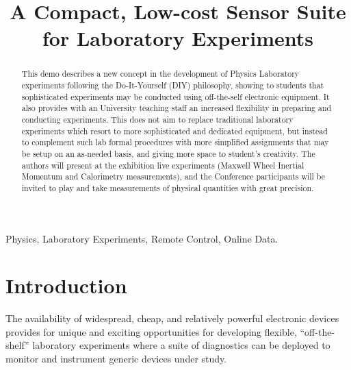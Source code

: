 \documentclass[conference]{IEEEtran}
\begin{document}
\title{A Compact, Low-cost Sensor Suite  for Laboratory Experiments
}

\author{
\and
{}
}

\maketitle

\begin{abstract}
This demo describes a new concept in the development of Physics Laboratory experiments 
 following  the Do-It-Yourself (DIY) philosophy, showing to students that sophisticated experiments may be conducted using off-the-self electronic equipment.
It also provides with an University teaching staff an increased flexibility in preparing and conducting experiments. 
This does not aim to replace traditional laboratory experiments which resort to more sophisticated and dedicated equipment,
but instead to complement such lab formal procedures with more simplified assignments that may be setup on an as-needed basis, 
and giving more space to student's creativity.
The authors will present at the exhibition live experiments (Maxwell Wheel Inertial Momentum and Calorimetry measurements), and the Conference 
participants will be invited to play 
and take measurements of physical quantities with great precision.

\end{abstract}

\begin{IEEEkeywords}
Physics, Laboratory Experiments, Remote Control, Online Data.
\end{IEEEkeywords}

\section{Introduction}
The availability of widespread, cheap, and relatively powerful electronic devices provides for unique and exciting opportunities for developing flexible, 
``off-the-shelf'' laboratory experiments where a suite of diagnostics can be deployed to monitor and instrument generic devices under study.
\end{document}
